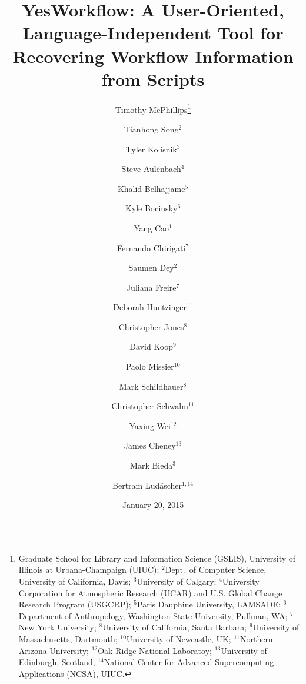 \documentclass{article}
\newcommand{\YWT}{\textsf{YesWorkflow}}
\begin{document}

\title{\bf \YWT: A User-Oriented, Language-Independent Tool for Recovering Workflow Information from Scripts}

\author{
  Timothy McPhillips\footnote{Graduate School for Library and
    Information Science (GSLIS), University of Illinois at
    Urbana-Champaign (UIUC);
   $^2$Dept.\ of Computer Science, University of California, Davis;
   $^3$University of Calgary;
   $^4$University Corporation for Atmospheric Research (UCAR) and U.S.
   Global Change Research Program (USGCRP);
  $^5$Paris Dauphine University, LAMSADE;
  $^6$Department of Anthropology, Washington State University, Pullman, WA; 
  $^7$New York University;
  $^8$University of California, Santa Barbara;
  $^9$University of Massachusetts, Dartmouth;
  $^{10}$University of Newcastle, UK;
  $^{11}$Northern Arizona University;
  $^{12}$Oak Ridge National Laboratoy;
  $^{13}$University of Edinburgh, Scotland;
  $^{14}$National Center for Advanced Supercomputing
   Applications (NCSA), UIUC.} \and
  \and 
  Tianhong Song$^2$ \and
  Tyler Kolisnik$^3$ \and 
  Steve Aulenbach$^4$ \and 
  Khalid Belhajjame$^5$ \and
  Kyle Bocinsky$^6$ \and
  Yang Cao$^1$ \and 
  Fernando Chirigati$^7$ \and
  Saumen Dey$^2$ \and
  Juliana Freire$^7$ \and   
  Deborah Huntzinger$^{11}$ \and
  Christopher Jones$^8$  \and 
  David Koop$^9$ \and 
  Paolo Missier$^{10}$ \and 
  Mark Schildhauer$^8$ \and 
  Christopher Schwalm$^{11}$ \and
  Yaxing Wei$^{12}$ \and
   James Cheney$^{13}$ \and
  Mark Bieda$^3$ \and
  Bertram Lud\"ascher$^{1, 14}$
}

\date{January 20, 2015}

\maketitle
\end{document}
